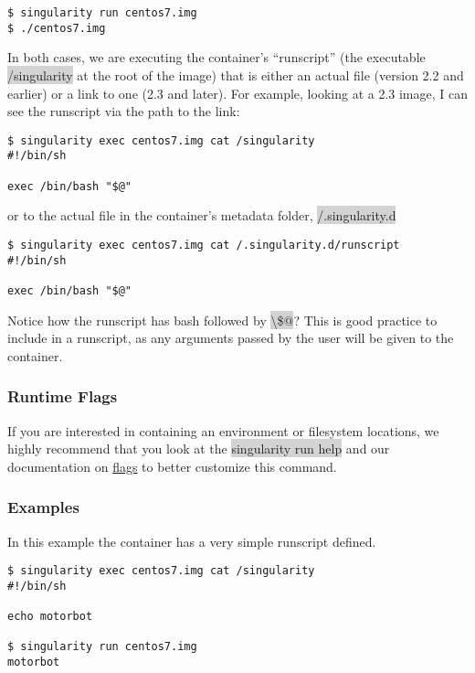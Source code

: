 \documentclass[a4paper]{article}
\begin{document}
\begin{lstlisting}[frame=single]
$ singularity run centos7.img
$ ./centos7.img
\end{lstlisting}

In both cases, we are executing the container’s “runscript” (the executable \colorbox{lightgray}{/singularity} at the root of the image) that is either an actual file (version 2.2 and earlier) or a link to one (2.3 and later). For example, looking at a 2.3 image, I can see the runscript via the path to the link:\begin{lstlisting}[frame=single]
$ singularity exec centos7.img cat /singularity
#!/bin/sh

exec /bin/bash "$@"
\end{lstlisting}

or to the actual file in the container’s metadata folder, \colorbox{lightgray}{/.singularity.d}

\begin{lstlisting}[frame=single]
$ singularity exec centos7.img cat /.singularity.d/runscript
#!/bin/sh

exec /bin/bash "$@"
\end{lstlisting}

Notice how the runscript has bash followed by  \colorbox{lightgray}{\textbackslash\$@}? This is good practice to include in a runscript, as any arguments passed by the user will be given to the container.\\[0.1in]


\subsubsection{Runtime Flags}
If you are interested in containing an environment or filesystem locations, we highly recommend that you look at the \colorbox{lightgray}{singularity run help} and our documentation on \href{http://singularity.lbl.gov/action-flags}{flags} to better customize this command.



\subsubsection{Examples}
In this example the container has a very simple runscript defined.\\[0.1in]

\begin{lstlisting}[frame=single]
$ singularity exec centos7.img cat /singularity
#!/bin/sh

echo motorbot

$ singularity run centos7.img
motorbot
\end{lstlisting}
\end{document}

